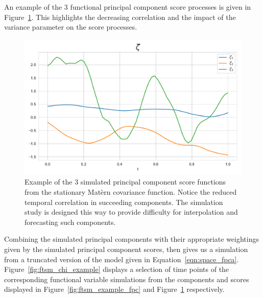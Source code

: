 An example of the $3$ functional principal component score processes is given in Figure~\ref{fig:ftsm_example_zeta}. 
This highlights the decreasing correlation and the impact of the variance parameter on the score processes. 

\begin{figure}[htbp!] 
	\centering    
	\includegraphics[width=1.0\textwidth]{sim_zeta_example}
	\caption[An example of the simulated functional principle component scores.]{Example of the 3 simulated principal component score functions from the stationary Mat\`{e}rn covariance function. Notice the reduced temporal correlation in succeeding components. The simulation study is designed this way to provide difficulty for interpolation and forecasting such components. }
	\label{fig:ftsm_example_zeta}
\end{figure}

Combining the simulated principal components with their appropriate weightings given by the simulated principal component scores, then gives us a simulation from a truncated version of the model given in Equation~\eqref{eqn:space_fpca}.
Figure~\ref{fig:ftsm_chi_example} displays a selection of time points of the corresponding functional variable simulations from the components and scores displayed in Figure~\ref{fig:ftsm_example_fpc} and Figure~\ref{fig:ftsm_example_zeta} respectively. 

